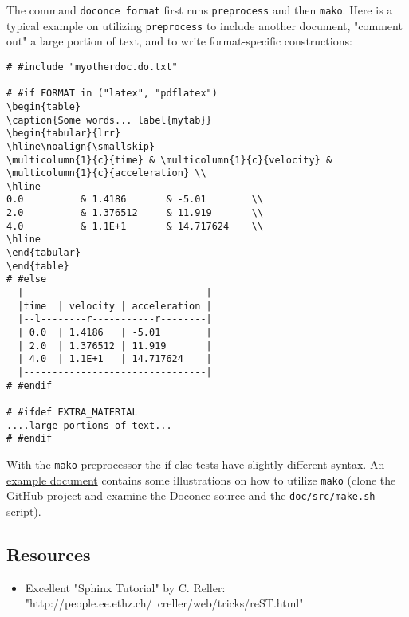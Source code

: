 \documentclass[twoside]{article}
\begin{document}
The command {\fontsize{10pt}{10pt}\verb!doconce format!} first runs {\fontsize{10pt}{10pt}\verb!preprocess!} and then {\fontsize{10pt}{10pt}\verb!mako!}.
Here is a typical example on utilizing {\fontsize{10pt}{10pt}\verb!preprocess!} to include another
document, "comment out" a large portion of text, and to write format-specific
constructions:

\begin{Verbatim}
# #include "myotherdoc.do.txt"

# #if FORMAT in ("latex", "pdflatex")
\begin{table}
\caption{Some words... label{mytab}}
\begin{tabular}{lrr}
\hline\noalign{\smallskip}
\multicolumn{1}{c}{time} & \multicolumn{1}{c}{velocity} & \multicolumn{1}{c}{acceleration} \\
\hline
0.0          & 1.4186       & -5.01        \\
2.0          & 1.376512     & 11.919       \\
4.0          & 1.1E+1       & 14.717624    \\
\hline
\end{tabular}
\end{table}
# #else
  |--------------------------------|
  |time  | velocity | acceleration |
  |--l--------r-----------r--------|
  | 0.0  | 1.4186   | -5.01        |
  | 2.0  | 1.376512 | 11.919       |
  | 4.0  | 1.1E+1   | 14.717624    |
  |--------------------------------|
# #endif

# #ifdef EXTRA_MATERIAL
....large portions of text...
# #endif
\end{Verbatim}

With the {\fontsize{10pt}{10pt}\verb!mako!} preprocessor the if-else tests have slightly different syntax.
An \href{{http://hplgit.github.com/bioinf-py/}}{example document} contains
some illustrations on how to utilize {\fontsize{10pt}{10pt}\verb!mako!} (clone the GitHub project and
examine the Doconce source and the {\fontsize{10pt}{10pt}\verb!doc/src/make.sh!} script).

\subsection{Resources}

\begin{itemize}
 \item Excellent "Sphinx Tutorial" by C. Reller: "http://people.ee.ethz.ch/~creller/web/tricks/reST.html"
\end{itemize}

\noindent

\printindex
\end{document}
